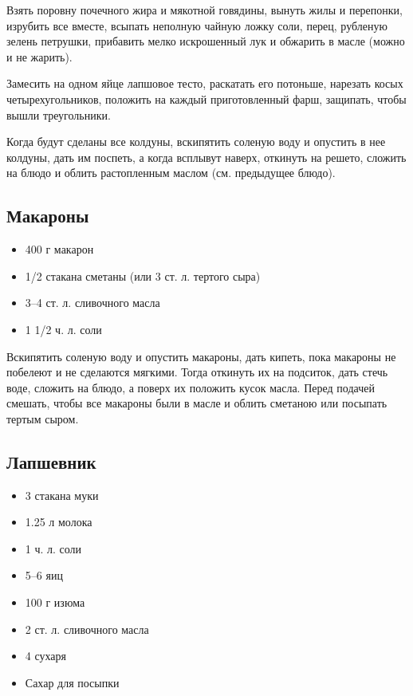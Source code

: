 Взять поровну почечного жира и мякотной говядины, вынуть жилы и перепонки, изрубить все вместе, всыпать неполную чайную ложку соли, перец, рубленую зелень петрушки, прибавить мелко искрошенный лук и обжарить в масле (можно и не жарить).

Замесить на одном яйце лапшовое тесто, раскатать его потоньше, нарезать косых четырехугольников, положить на каждый приготовленный фарш, защипать, чтобы вышли треугольники.

Когда будут сделаны все колдуны, вскипятить соленую воду и опустить в нее колдуны, дать им поспеть, а когда всплывут наверх, откинуть на решето, сложить на блюдо и облить растопленным маслом (см. предыдущее блюдо).

\subsection{Макароны}

\begin{itemize}
	\item 400 г макарон
    \item 1/2 стакана сметаны (или 3 ст. л. тертого сыра) 
    \item 3–4 ст. л. сливочного масла 
    \item 1 1/2 ч. л. соли
\end{itemize}

Вскипятить соленую воду и опустить макароны, дать кипеть, пока макароны не побелеют и не сделаются мягкими. Тогда откинуть их на подситок, дать стечь воде, сложить на блюдо, а поверх их положить кусок масла. Перед подачей смешать, чтобы все макароны были в масле и облить сметаною или посыпать тертым сыром.

\subsection{Лапшевник}\label{sec:rec22}

\begin{itemize}
	\item 3 стакана муки
    \item 1.25 л молока 
    \item 1 ч. л. соли 
    \item 5–6 яиц 
    \item 100 г изюма
    \item 2 ст. л. сливочного масла 
    \item 4 сухаря 
    \item Сахар для посыпки
\end{itemize}


